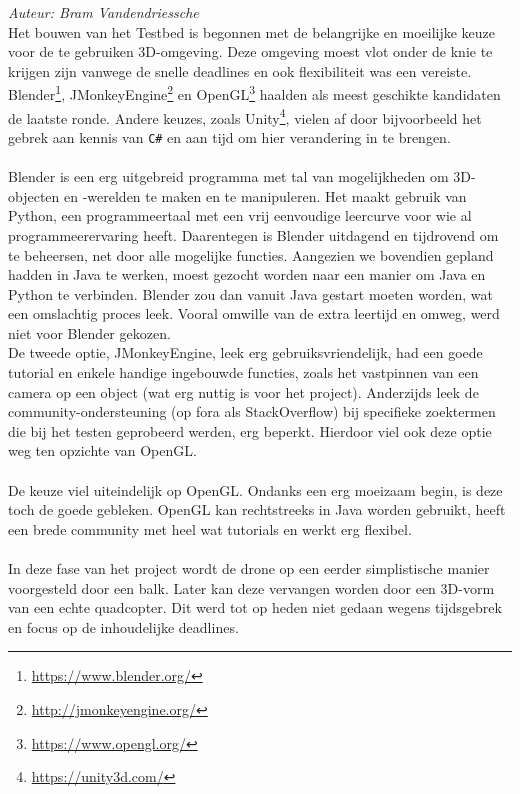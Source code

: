{\em Auteur: Bram Vandendriessche}\\

\noindent
Het bouwen van het Testbed is begonnen met de belangrijke en moeilijke keuze voor de te gebruiken 3D-omgeving. Deze omgeving moest vlot onder de knie te krijgen zijn vanwege de snelle deadlines en ook flexibiliteit was een vereiste. Blender\footnote{\url{https://www.blender.org/}}, JMonkeyEngine\footnote{\url{http://jmonkeyengine.org/}} en OpenGL\footnote{\url{https://www.opengl.org/}} haalden als meest geschikte kandidaten de laatste ronde. Andere keuzes, zoals Unity\footnote{\url{https://unity3d.com/}}, vielen af door bijvoorbeeld het gebrek aan kennis van \texttt{C\#} en aan tijd om hier verandering in te brengen.\\
~\\
Blender is een erg uitgebreid programma met tal van mogelijkheden om 3D-objecten en -werelden te maken en te manipuleren. Het maakt gebruik van Python, een programmeertaal met een vrij eenvoudige leercurve voor wie al programmeerervaring heeft. Daarentegen is Blender uitdagend en tijdrovend om te beheersen, net door alle mogelijke functies. Aangezien we bovendien gepland hadden in Java te werken, moest gezocht worden naar een manier om Java en Python te verbinden. Blender zou dan vanuit Java gestart moeten worden, wat een omslachtig proces leek. Vooral omwille van de extra leertijd en omweg, werd niet voor Blender gekozen. \\
De tweede optie, JMonkeyEngine, leek erg gebruiksvriendelijk, had een goede tutorial en enkele handige ingebouwde functies, zoals het vastpinnen van een camera op een object (wat erg nuttig is voor het project). Anderzijds leek de community-ondersteuning (op fora als StackOverflow) bij specifieke zoektermen die bij het testen geprobeerd werden, erg beperkt. Hierdoor viel ook deze optie weg ten opzichte van OpenGL.\\
\\
De keuze viel uiteindelijk op OpenGL. Ondanks een erg moeizaam begin, is deze toch de goede gebleken. OpenGL kan rechtstreeks in Java worden gebruikt, heeft een brede community met heel wat tutorials en werkt erg flexibel.
\\
\\
In deze fase van het project wordt de drone op een eerder simplistische manier voorgesteld door een balk. Later kan deze vervangen worden door een 3D-vorm van een echte quadcopter. Dit werd tot op heden niet gedaan wegens tijdsgebrek en focus op de inhoudelijke deadlines. 

